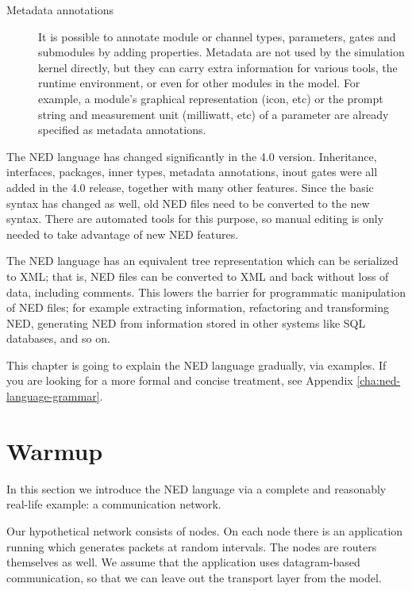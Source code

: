 \begin{description}
\item[Metadata annotations] It is possible to annotate module or channel
types, parameters, gates and submodules by adding properties. Metadata are
not used by the simulation kernel directly, but they can carry extra
information for various tools, the runtime environment, or even for other
modules in the model. For example, a module's graphical representation
(icon, etc)  or the prompt string and measurement unit (milliwatt, etc) of a
parameter are already specified as metadata annotations.

\end{description}

\begin{note}
    The NED language has changed significantly in the 4.0 version.
    Inheritance, interfaces, packages, inner types, metadata annotations, inout
    gates were all added in the 4.0 release, together with many other features.
    Since the basic syntax has changed as well, old NED files need to be
    converted to the new syntax. There are automated tools for this purpose, so
    manual editing is only needed to take advantage of new NED features.
\end{note}

The NED language has an equivalent tree representation which can be
serialized to XML; that is, NED files can be converted to XML and back
without loss of data, including comments. This lowers the barrier for
programmatic manipulation of NED files; for example extracting information,
refactoring and transforming NED, generating NED from information stored in
other systems like SQL databases, and so on.

\begin{note}
    This chapter is going to explain the NED language gradually, via examples.
    If you are looking for a more formal and concise treatment, see
    Appendix \ref{cha:ned-language-grammar}.
\end{note}


\section{Warmup}
\label{sec:ch-ned-lang:warmup}

In this section we introduce the NED language via a complete and
reasonably real-life example: a communication network.

Our hypothetical network consists of nodes. On each node there is an
application running which generates packets at random intervals.
The nodes are routers themselves as well. We assume that the application
uses datagram-based communication, so that we can leave out the
transport layer from the model.


